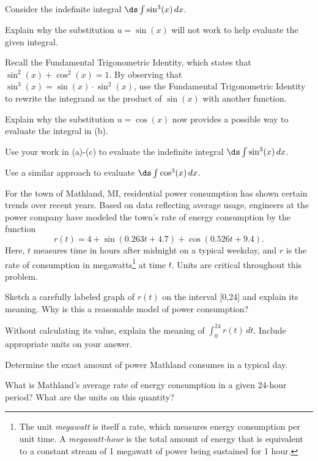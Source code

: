 \begin{exercises}
  \item Consider the indefinite integral $\ds \int \sin^3(x) \, dx$. 
  \ba
  	\item Explain why the substitution $u = \sin(x)$ will not work to help evaluate the given integral.
	\item Recall the Fundamental Trigonometric Identity, which states that $\sin^2(x) + \cos^2(x) = 1$.  By observing that $\sin^3(x) = \sin(x) \cdot \sin^2(x)$, use the Fundamental Trigonometric Identity to rewrite the integrand as the product of $\sin(x)$ with another function.
	\item Explain why the substitution $u = \cos(x)$ now provides a possible way to evaluate the integral in (b).
	\item Use your work in (a)-(c) to evaluate the  indefinite integral $\ds \int \sin^3(x) \, dx$.
	\item Use a similar approach to evaluate $\ds \int \cos^3(x) \, dx$.
  \ea
  
  \item For the town of Mathland, MI, residential power consumption has shown certain trends over recent years.  Based on data reflecting average usage, engineers at the power company have modeled the town's rate of energy consumption by the function
 $$r(t) = 4 + \sin(0.263t + 4.7) + \cos(0.526t+9.4).$$
Here, $t$ measures time in hours after midnight on a typical weekday, and $r$ is the rate of consumption in megawatts\footnote{The unit \emph{megawatt} is itself a rate, which measures energy consumption per unit time.  A \emph{megawatt-hour} is the total amount of energy that is equivalent to a constant stream of 1 megawatt of power being sustained for 1 hour.} at time $t$. 
Units are critical throughout this problem.
	\ba
		\item Sketch a carefully labeled graph of $r(t)$ on the interval [0,24] and explain its meaning.  Why is this a reasonable model of power consumption?
		\item Without calculating its value, explain the meaning of $\int_0^{24} r(t) \, dt$.   Include appropriate units on your answer.
		
  		\item Determine the exact amount of power Mathland consumes in a typical day.  
		\item What is Mathland's average rate of energy consumption in a given 24-hour period?  What are the units on this quantity?
	\ea
\end{exercises}
\afterexercises
